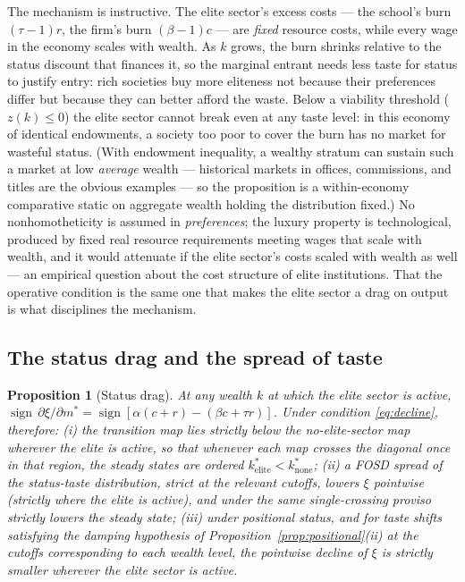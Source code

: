\documentclass[12pt,letterpaper]{article}
\newtheorem{proposition}{Proposition}
\theoremstyle{definition}
\begin{document}
The mechanism is instructive.
The elite sector's excess costs --- the school's burn $(\tau-1)r$, the firm's burn $(\beta-1)c$ --- are \emph{fixed} resource costs, while every wage in the economy scales with wealth.
As $k$ grows, the burn shrinks relative to the status discount that finances it, so the marginal entrant needs less taste for status to justify entry: rich societies buy more eliteness not because their preferences differ but because they can better afford the waste.
Below a viability threshold ($z(k)\leq 0$) the elite sector cannot break even at any taste level: in this economy of identical endowments, a society too poor to cover the burn has no market for wasteful status.
(With endowment inequality, a wealthy stratum can sustain such a market at low \emph{average} wealth --- historical markets in offices, commissions, and titles are the obvious examples --- so the proposition is a within-economy comparative static on aggregate wealth holding the distribution fixed.)
No nonhomotheticity is assumed in \emph{preferences}; the luxury property is technological, produced by fixed real resource requirements meeting wages that scale with wealth, and it would attenuate if the elite sector's costs scaled with wealth as well --- an empirical question about the cost structure of elite institutions.
That the operative condition is the same one that makes the elite sector a drag on output is what disciplines the mechanism.

\subsection{The status drag and the spread of taste}

\begin{proposition}[Status drag]\label{prop:drag} At any wealth $k$ at which the elite sector is active, $\operatorname{sign}\,\partial \xi/\partial m^\ast = \operatorname{sign} [\alpha(c+r)-(\beta c+\tau r)]$.
Under condition \eqref{eq:decline}, therefore: (i) the transition map lies strictly below the no-elite-sector map wherever the elite is active, so that whenever each map crosses the diagonal once in that region, the steady states are ordered $k^\ast_{\mathrm{elite}} < k^\ast_{\mathrm{none}}$; (ii) a FOSD spread of the status-taste distribution, strict at the relevant cutoffs, lowers $\xi$ pointwise (strictly where the elite is active), and under the same single-crossing proviso strictly lowers the steady state; (iii) under positional status, and for taste shifts satisfying the damping hypothesis of Proposition~\ref{prop:positional}(ii) at the cutoffs corresponding to each wealth level, the pointwise decline of $\xi$ is strictly smaller wherever the elite sector is active.
\end{proposition}
\end{document}

